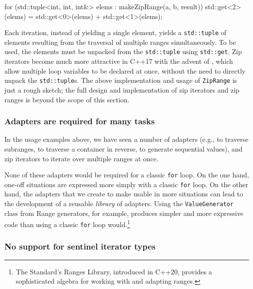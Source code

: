 {{{\begin{emcppslisting}
{    for (std::tuple<int, int, int&> elems : makeZipRange(a, b, result))
    {
        std::get<2>(elems) = std::get<0>(elems) + std::get<1>(elems);
    }
}
\end{emcppslisting}
    
\noindent Each iteration, instead of yielding a single element, yields a
\lstinline!std::tuple! of elements resulting from the traversal of multiple
ranges simultaneously. To be used, the elements must be unpacked from
the \lstinline!std::tuple! using \lstinline!std::get!. Zip iterators become
much more attractive in C++17 with the advent of , which allow multiple loop variables to be declared at once,
without the need to directly unpack the \lstinline!std::tuple!s. The above
implementation and usage of \lstinline!ZipRange! is just a rough sketch;
the full design and implementation of zip iterators and zip ranges is
beyond the scope of this section.

\subsubsection[Adapters are required for many tasks]{Adapters are required for many tasks}\label{adapters-are-required-for-many-tasks}

In the usage examples above, we have seen a number of adapters (e.g., to
traverse subranges, to traverse a container in reverse, to generate
sequential values), and zip iterators to iterate over multiple ranges at
once.

None of these adapters would be required for a classic \lstinline!for!
loop. On the one hand, one-off situations are expressed more simply with
a classic \lstinline!for! loop. On the other hand, the adapters that we
create to make  usable in more
situations can lead to the development of a reusable \emph{library} of
adapters. Using the \lstinline!ValueGenerator! class from {Range
generators}, for example, produces simpler and more expressive code than
using a classic \lstinline!for! loop would.{\cprotect\footnote{The
Standard's Ranges Library, introduced in C++20, provides a
  sophisticated algebra for working with and adapting ranges.}}

\subsubsection[No support for sentinel iterator types]{No support for sentinel iterator types}\label{no-support-for-sentinel-iterator-types}

}}}
